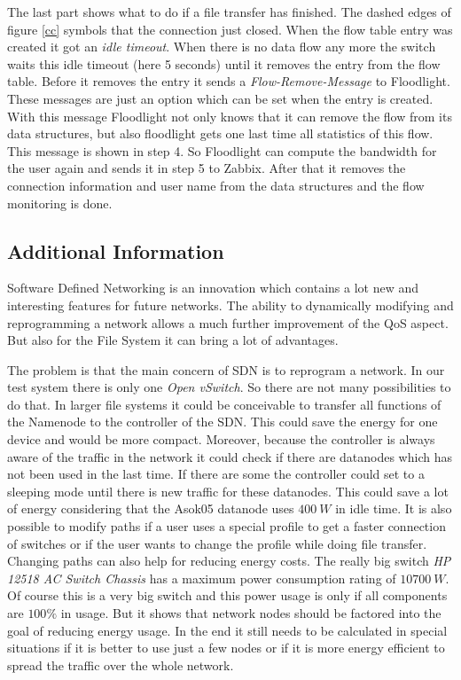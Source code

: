 The last part shows what to do if a file transfer has finished. The dashed edges of figure \ref{cc} symbols that the connection just closed. When the flow table entry was created it got an \textit{idle timeout}\cite[p. 11]{ofspec}. When there is no data flow any more the switch waits this idle timeout (here 5 seconds) until it removes the entry from the flow table. Before it removes the entry it sends a \textit{Flow-Remove-Message}\cite[p. 37]{ofspec} to Floodlight. These messages are just an option which can be set when the entry is created. With this message Floodlight not only knows that it can remove the flow from its data structures, but also floodlight gets one last time all statistics of this flow. This message is shown in step 4. So Floodlight can compute the bandwidth for the user again and sends it in step 5 to Zabbix. After that it removes the connection information and user name from the data structures and the flow monitoring is done.

\subsection{Additional Information}

Software Defined Networking is an innovation which contains a lot new and interesting features for future networks. The ability to dynamically modifying and reprogramming a network allows a much further improvement of the QoS aspect. But also for the File System it can bring a lot of advantages.

The problem is that the main concern of SDN is to reprogram a network. In our test system there is only one \textit{Open vSwitch}. So there are not many possibilities to do that. In larger file systems it could be conceivable to transfer all functions of the Namenode to the controller of the SDN. This could save the energy for one device and would be more compact. Moreover, because the controller is always aware of the traffic in the network it could check if there are datanodes which has not been used in the last time. If there are some the controller could set to a sleeping mode until there is new traffic for these datanodes. This could save a lot of energy considering that the Asok05 datanode uses $400\ W$ in idle time. It is also possible to modify paths if a user uses a special profile to get a faster connection of switches or if the user wants to change the profile while doing file transfer. Changing paths can also help for reducing energy costs. The really big switch \textit{HP 12518 AC Switch Chassis} has a maximum power consumption rating of $10700\ W$\cite{hp}. Of course this is a very big switch and this power usage is only if all components are $100\%$ in usage. But it shows that network nodes should be factored into the goal of reducing energy usage. In the end it still needs to be calculated in special situations if it is better to use just a few nodes or if it is more energy efficient to spread the traffic over the whole network. 

